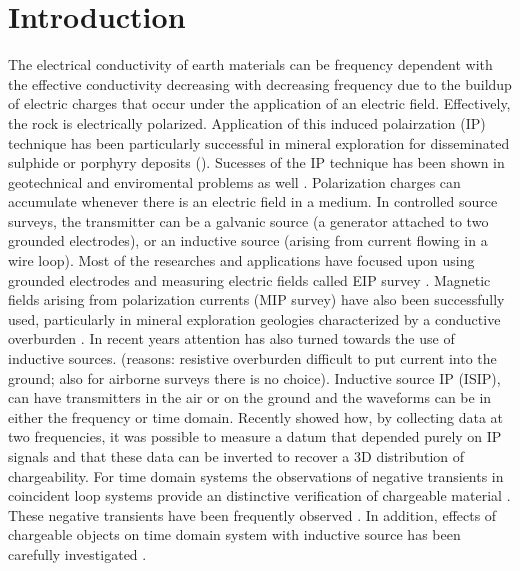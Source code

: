 \documentclass[extra,mreferee]{gji}
\begin{document}
\linenumbers
\section{Introduction}
The electrical conductivity of earth materials can be frequency dependent with the effective conductivity decreasing with decreasing frequency due to the buildup of electric charges that occur under the application of an electric field.
Effectively, the rock is electrically polarized. 
Application of this induced polairzation (IP) technique has been particularly successful in mineral exploration for disseminated sulphide or porphyry deposits (\cite[]{Pelton1978, Fink1990}). Sucesses of the IP technique has been shown in geotechnical and enviromental problems as well \cite[]{Kemna2012}. 
Polarization charges can accumulate whenever there is an electric field in a medium. In controlled source surveys, the transmitter can be a galvanic source (a generator attached to two grounded electrodes), or an inductive source (arising from current flowing in a wire loop). Most of the researches and applications have focused upon using grounded electrodes and measuring electric fields called EIP survey \cite[]{seigel1959}. Magnetic fields arising from polarization currents (MIP survey) have also been successfully used, particularly in mineral exploration geologies characterized by a conductive overburden \cite[]{seigel1974}. In recent years attention has also turned towards the use of inductive sources. (reasons:  resistive overburden difficult to put current into the ground; also for airborne surveys there is no choice).  Inductive source IP (ISIP), can have transmitters in the air or on the ground and the waveforms can be in either the frequency or time domain. Recently  \cite{Marchant2012b} showed how, by collecting data at two frequencies, it was possible to measure a datum that depended purely on IP signals and that these data can be inverted to recover a 3D distribution of chargeability. 
For time domain systems the observations of negative transients in coincident loop systems provide an distinctive verification of chargeable material \cite[]{Weidelt1982}. These negative transients have been frequently observed \cite[]{SmithandKlein,Kratzer2012,Kang2015a}. In addition, effects of chargeable objects on time domain system with inductive source has been carefully investigated \cite[]{Smith1988a,Flis1989,ElKaliouby2004, Marchant2014}. 
\end{document}
